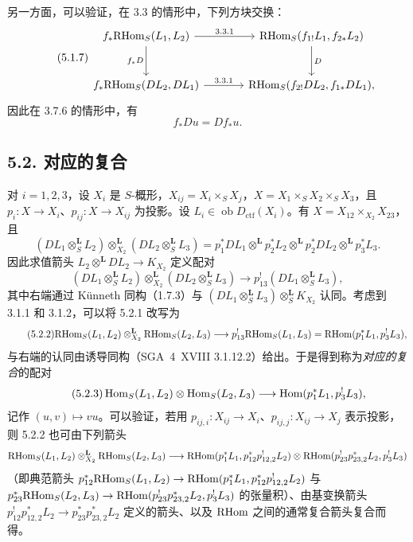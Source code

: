 另一方面，可以验证，在 3.3 的情形中，下列方块交换：
\begin{equation}
\tag{5.1.7}
\begin{tikzcd}[column sep=large,row sep=large]
f_*\RHom_S(L_1,L_2) \arrow[r,"3.3.1"] \arrow[d,"f_*D"']
& \RHom_S(f_{1!}L_1,f_{2*}L_2) \arrow[d,"D"] \\
f_*\RHom_S(DL_2,DL_1) \arrow[r,"3.3.1"]
& \RHom_S(f_{2!}DL_2,f_{1*}DL_1),
\end{tikzcd}
\end{equation}
因此在 3.7.6 的情形中，有
\begin{equation}
\tag{5.1.8}
f_*Du=Df_*u.
\end{equation}

\subsection*{5.2. 对应的复合}

对 $i=1,2,3$，设 $X_i$ 是 $S$-概形，$X_{ij}=X_i\times_SX_j$，$X=X_1\times_SX_2\times_SX_3$，且 $p_i:X\to X_i$、$p_{ij}:X\to X_{ij}$ 为投影。设 $L_i\in\operatorname{ob}D_{\mathrm{ctf}}(X_i)$。有 $X=X_{12}\times_{X_2}X_{23}$，且
\[
(DL_1\otimes_S^{\mathbf L}L_2)\otimes_{X_2}^{\mathbf L}(DL_2\otimes_S^{\mathbf L}L_3)
=p_1^*DL_1\otimes^{\mathbf L}p_2^*L_2\otimes^{\mathbf L}p_2^*DL_2\otimes^{\mathbf L}p_3^*L_3.
\]
因此求值箭头 $L_2\otimes^{\mathbf L}DL_2\to K_{X_2}$ 定义配对
\begin{equation}
\tag{5.2.1}
(DL_1\otimes_S^{\mathbf L}L_2)\otimes_{X_2}^{\mathbf L}(DL_2\otimes_S^{\mathbf L}L_3)\longrightarrow p_{13}^!(DL_1\otimes_S^{\mathbf L}L_3),
\end{equation}
其中右端通过 Künneth 同构（1.7.3）与 $(DL_1\otimes_S^{\mathbf L}L_3)\otimes_S^{\mathbf L}K_{X_2}$ 认同。考虑到 3.1.1 和 3.1.2，可以将 5.2.1 改写为
\begin{equation}
\tag{5.2.2}
\mathrm{RHom}_S(L_1,L_2)\otimes_{X_2}^{\mathbf L}\mathrm{RHom}_S(L_2,L_3)\longrightarrow p_{13}^!\mathrm{RHom}_S(L_1,L_3)=\mathrm{RHom}(p_1^*L_1,p_3^!L_3),
\end{equation}
与右端的认同由诱导同构（SGA~4~XVIII 3.1.12.2）给出。于是得到称为\emph{对应的复合}的配对
\begin{equation}
\tag{5.2.3}
\operatorname{Hom}_S(L_1,L_2)\otimes\operatorname{Hom}_S(L_2,L_3)\longrightarrow\operatorname{Hom}(p_1^*L_1,p_3^!L_3),
\end{equation}
记作 $(u,v)\mapsto vu$。可以验证，若用 $p_{ij,i}:X_{ij}\to X_i$、$p_{ij,j}:X_{ij}\to X_j$ 表示投影，则 5.2.2 也可由下列箭头
\[
\mathrm{RHom}_S(L_1,L_2)\otimes_{X_2}^{\mathbf L}\mathrm{RHom}_S(L_2,L_3)
\longrightarrow
\mathrm{RHom}(p_1^*L_1,p_{12}^*p_{12,2}^!L_2)
\otimes
\mathrm{RHom}(p_{23}^!p_{23,2}^*L_2,p_3^!L_3)
\]
（即典范箭头 $p_{12}^*\mathrm{RHom}_S(L_1,L_2)\to\allowbreak \mathrm{RHom}(p_1^*L_1,p_{12}^*p_{12,2}^!L_2)$ 与 $p_{23}^*\mathrm{RHom}_S(L_2,L_3)\to\allowbreak \mathrm{RHom}(p_{23}^!p_{23,2}^*L_2,p_3^!L_3)$ 的张量积）、由基变换箭头 $p_{12}^!p_{12,2}^*L_2\to\allowbreak  p_{23}^*p_{23,2}^*L_2$ 定义的箭头、以及 $\mathrm{RHom}$ 之间的通常复合箭头复合而得。


